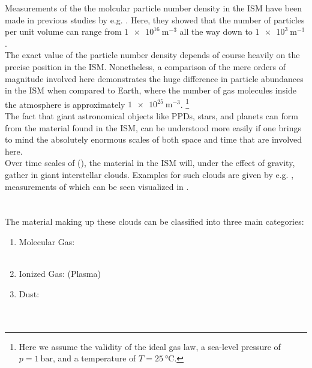        Measurements of the the molcular particle number density in the ISM have been made in 
        previous studies by e.g. \cite{burton_2013}. Here, they showed that the number of particles 
        per unit volume can range from $\SI{1e16}{\meter^{-3}}$ all the way down to 
        $\SI{1e3}{\meter^{-3}}$. \\

        The exact value of the particle number density depends of course heavily on the precise 
        position in the ISM. Nonetheless, a comparison of the mere orders of magnitude involved 
        here demonstrates the huge difference in particle abundances in the ISM when compared to 
        Earth, where the number of gas molecules inside the atmosphere is approximately 
        $\SI{1e25}{\meter^{-3}}$.
        \footnote{Here we assume the validity of the ideal gas law, a sea-level pressure of 
                  $p=\SI{1}{\bar}$, and a temperature of $T=\SI{25}{\celsius}$.}
        \\

        The fact that giant astronomical objects like PPDs, stars, and planets can form from the 
        material found in the ISM, can be understood more easily if one brings to mind the
        absolutely enormous scales of both space and time that are involved here. \\

        Over time scales of (), the material in the ISM 
        will, under the effect of gravity, gather in giant interstellar clouds. Examples for such 
        clouds are given by e.g. , measurements of which can be seen 
        visualized in . \\

         \\
         \\

        

        The material making up these clouds can be classified into three main categories:
        \begin{enumerate}
            \item Molecular Gas: \\
                 \\
            \item Ionized Gas: (Plasma) \\ 
                \todo{}
            \item Dust: \\
                 \\
                 \\
        \end{enumerate}

